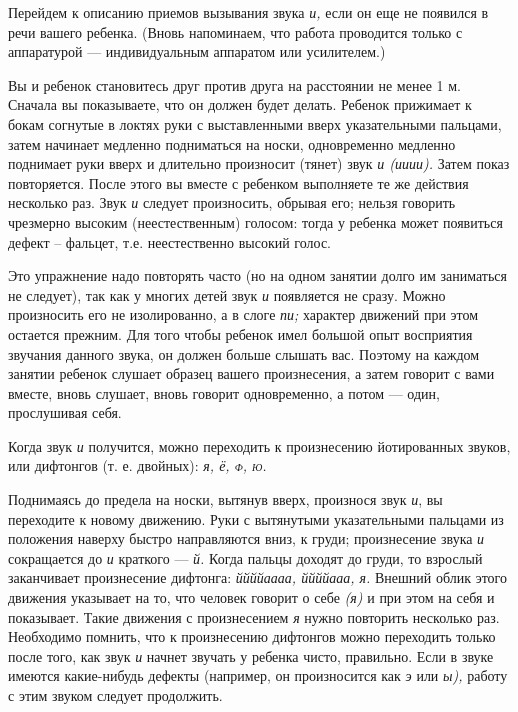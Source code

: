 \documentclass[a5paper]{book}
\renewcommand{\emph}[1]{\textit{#1}}
\begin{document}
Перейдем к описанию приемов вызывания звука \emph{и,} если он еще не
появился в речи вашего ребенка. (Вновь напоминаем, что работа проводится
только с аппаратурой --- индивидуальным аппаратом или усилителем.)

Вы и ребенок становитесь друг против друга на расстоянии не менее 1 м.
Сначала вы показываете, что он должен будет делать. Ребенок прижимает к
бокам согнутые в локтях руки с выставленными вверх указательными
пальцами, затем начинает медленно подниматься на носки, одновременно
медленно поднимает руки вверх и длительно произносит (тянет) звук
\emph{и (ииии).} Затем показ повторяется. После этого вы вместе с
ребенком выполняете те же действия несколько раз. Звук \emph{и} следует
произносить, обрывая его; нельзя говорить чрезмерно высоким
(неестественным) голосом: тогда у ребенка может появиться дефект --
фальцет, т.е. неестественно высокий голос.

Это упражнение надо повторять часто (но на одном занятии долго им
заниматься не следует), так как у многих детей звук \emph{и} появляется
не сразу. Можно произносить его не изолированно, а в слоге \emph{пи;}
характер движений при этом остается прежним. Для того чтобы ребенок имел
большой опыт восприятия звучания данного звука, он должен больше слышать
вас. Поэтому на каждом занятии ребенок слушает образец вашего
произнесения, а затем говорит с вами вместе, вновь слушает, вновь
говорит одновременно, а потом --- один, прослушивая себя.

Когда звук \emph{и} получится, можно переходить к произнесению
йотированных звуков, или дифтонгов (т. е. двойных): \emph{я, ё,
\textsc{ф, ю.}}

Поднимаясь до предела на носки, вытянув вверх, произнося звук \emph{и},
вы переходите к новому движению. Руки с вытянутыми указательными
пальцами из положения наверху быстро направляются вниз, к груди;
произнесение звука \emph{и} сокращается до \emph{и} краткого ---
\emph{й.} Когда пальцы доходят до груди, то взрослый заканчивает
произнесение дифтонга: \emph{ййййаааа, ййййааа, я.} Внешний облик этого
движения указывает на то, что человек говорит о себе \emph{(я)} и при
этом на себя и показывает. Такие движения с произнесением \emph{я} нужно
повторить несколько раз. Необходимо помнить, что к произнесению
дифтонгов можно переходить только после того, как звук \emph{и} начнет
звучать у ребенка чисто, правильно. Если в звуке имеются какие-нибудь
дефекты (например, он произносится как \emph{э} или \emph{ы),} работу с
этим звуком следует продолжить.
\end{document}
